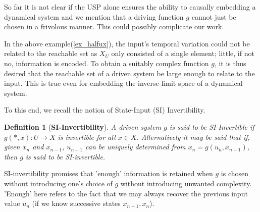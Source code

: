 \documentclass[a4paper,12pt,twoside]{report}
\newtheorem{Definition}{Definition}[]
\begin{document}
So far it is not clear if the USP alone ensures the ability to causally embedding a dynamical system and we mention that a driving function $g$ cannot just be chosen in a frivolous manner. This could possibly complicate our work. %





In the above example(\ref{ex_halfux}), the input's temporal variation could not be related to the reachable set as $X_U$ only consisted of a single element; little, if not no, information is encoded.
To obtain a suitably complex function $g$, it is thus desired that the reachable set of a driven system  be large enough to relate to the input. 
This is true even for embedding  the inverse-limit space of a dynamical system. 


 To this end, we recall the notion of State-Input (SI) Invertibility.  

\begin{Definition}
  [\bf SI-Invertibility]\label{Dfn_SIinv}\rm
  A driven system $g$ is said to be SI-Invertible if $g(*,x): U \to X$ is invertible for all $x\in X$. Alternatively it may be said that if, given $x_n$ and $x_{n-1}$, $u_{n-1}$ can be uniquely determined from $x_n=g(u_n,x_{n-1})$, then $g$ is said to be SI-invertible.
\end{Definition}
 
SI-invertibility promises that 'enough' information is retained when $g$ is chosen without introducing one's choice of $g$ without introducing unwanted complexity. 
'Enough' here refers to the fact that we may always recover the previous input value $u_n$ (if we know successive states $x_{n-1}, x_n$).
\end{document}
